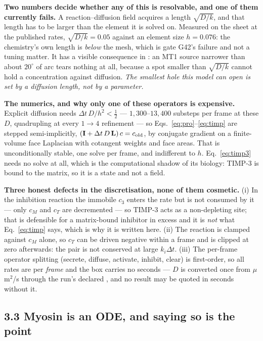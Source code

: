 \textbf{Two numbers decide whether any of this is resolvable, and one of them currently fails.} A
reaction--diffusion field acquires a length $\sqrt{D/k}$, and that length has to be larger than the
element it is solved on. Measured on the sheet at the published rates, $\sqrt{D/k}=0.05$ against an
element size $h=0.076$: the chemistry's own length is \emph{below} the mesh, which is gate G42's
failure and not a tuning matter. It has a visible consequence in : an MT1 source narrower than
about $20^\circ$ of arc tears nothing at all, because a spot smaller than $\sqrt{D/k}$ cannot hold a
concentration against diffusion. \emph{The smallest hole this model can open is set by a diffusion
length, not by a parameter.}

\textbf{The numerics, and why only one of these operators is expensive.} Explicit diffusion needs
$\Delta t\,D/h^2<\tfrac12$ --- $1{,}300$--$13{,}400$ substeps per frame at these $D$, quadrupling at
every $1\!\to\!4$ refinement --- so Eqs.~\eqref{eq:pro}--\eqref{eq:timp} are stepped semi-implicitly,
$(\mathbf I+\Delta t\,D\,\mathbf L)\,c = c_{\rm old}$, by conjugate gradient on a finite-volume face
Laplacian with cotangent weights and face areas. That is unconditionally stable, one solve per frame,
and indifferent to $h$. Eq.~\eqref{eq:timp3} needs no solve at all, which is the computational shadow
of its biology: TIMP-3 is bound to the matrix, so it is a state and not a field.

\textbf{Three honest defects in the discretisation, none of them cosmetic.} (i) In the inhibition
reaction the immobile $c_3$ enters the rate but is not consumed by it --- only $c_M$ and $c_T$ are
decremented --- so TIMP-3 acts as a non-depleting site; that is defensible for a matrix-bound
inhibitor in excess and it is \emph{not} what Eq.~\eqref{eq:timp} says, which is why it is written
here. (ii) The reaction is clamped against $c_M$ alone, so $c_T$ can be driven negative within a frame
and is clipped at zero afterwards: the pair is not conserved at large $k_i\Delta t$. (iii) The
per-frame operator splitting (secrete, diffuse, activate, inhibit, clear) is first-order, so all rates
are per \emph{frame} and the box carries no seconds --- $D$ is converted once from $\mu$m$^2$/s
through the run's declared , and no result may be quoted in seconds without it.

\subsection*{3.3\; Myosin is an ODE, and saying so is the point}

